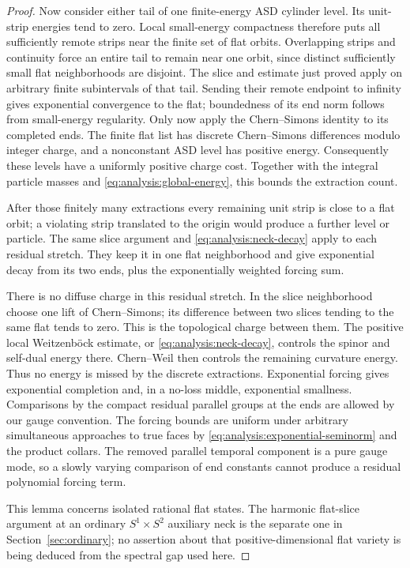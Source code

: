 \begin{proof}
Now consider either tail of one finite-energy ASD cylinder level.
Its unit-strip energies tend to zero.  Local small-energy compactness
therefore puts all sufficiently remote strips near the finite set of
flat orbits.  Overlapping strips and continuity force an entire tail
to remain near one orbit, since distinct sufficiently small flat
neighborhoods are disjoint.  The slice and estimate just proved apply
on arbitrary finite subintervals of that tail.  Sending their remote
endpoint to infinity gives exponential convergence to the flat;
boundedness of its end norm follows from small-energy regularity.
Only now apply the Chern--Simons identity to its completed ends.
The finite flat list has discrete Chern--Simons differences modulo
integer charge, and a nonconstant ASD level has positive energy.
Consequently these levels have a uniformly positive charge cost.
Together with the integral particle masses and
\eqref{eq:analysis:global-energy}, this bounds the extraction count.

After those finitely many extractions every remaining unit strip is
close to a flat orbit; a violating strip translated to the origin
would produce a further level or particle.  The same slice argument
and \eqref{eq:analysis:neck-decay} apply to each residual stretch.
They keep it in one flat neighborhood and give exponential decay
from its two ends, plus the exponentially weighted forcing sum.

There is no diffuse charge in this residual stretch.  In the slice
neighborhood choose one lift of Chern--Simons; its difference between
two slices tending to the same flat tends to zero.  This is the
topological charge between them.  The positive local Weitzenb\"ock
estimate, or \eqref{eq:analysis:neck-decay}, controls the spinor and
self-dual energy there.  Chern--Weil then controls the remaining
curvature energy.  Thus no energy is missed by the discrete extractions.
Exponential forcing gives exponential completion and, in a no-loss
middle, exponential smallness.  Comparisons by the compact residual
parallel groups at the ends are allowed by our gauge convention.
The forcing bounds are uniform under arbitrary simultaneous approaches
to true faces by \eqref{eq:analysis:exponential-seminorm} and the
product collars.  The removed parallel temporal component is a pure
gauge mode, so a slowly varying comparison of end constants cannot
produce a residual polynomial forcing term.

This lemma concerns isolated rational flat states.  The harmonic
flat-slice argument at an ordinary $S^1\times S^2$ auxiliary neck is
the separate one in Section~\ref{sec:ordinary}; no assertion about
that positive-dimensional flat variety is being deduced from the
spectral gap used here.
\end{proof}

